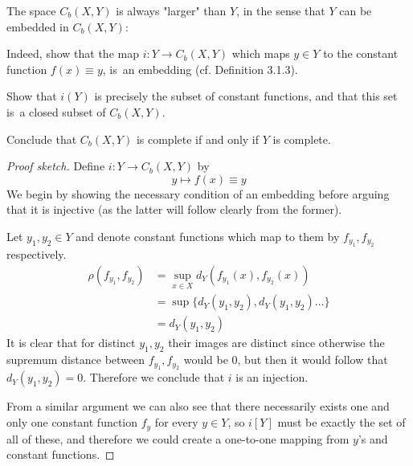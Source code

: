 \begin{prob}
    The space $C_b(X,Y)$ is always "larger" than $Y$, in the sense that $Y$ can be embedded in $C_b(X,Y)$:

    Indeed, show that the map $i:Y\to C_b(X,Y)$ 
    which maps $y\in Y$ to the constant function $f(x)\equiv y$, is an embedding (cf. Definition 3.1.3).
    
    Show that $i(Y)$ is precisely the subset of constant functions, and that this set is a closed subset of $C_b(X,Y)$.
    
    Conclude that $C_b(X,Y)$ is complete if and only if $Y$ is complete.
\end{prob}
\begin{proof}[Proof sketch]
    Define $i: Y \to C_b(X,Y)$ by 
    \[
        y \mapsto f(x) \equiv y
    \]
    We begin by showing the necessary condition of an embedding 
    before arguing that it is injective (as the latter will 
    follow clearly from the former). 

    Let $y_1,y_2 \in Y$ and denote constant functions which map 
    to them by $f_{y_1}, f_{y_2}$ respectively. 
    \begin{align*}
        \rho(f_{y_1}, f_{y_2}) &= \sup_{x\in X}d_Y(f_{y_1}(x), 
        f_{y_2}(x)) \\ 
        &= \sup\{d_Y(y_1, y_2), d_Y(y_1,y_2) \ldots\} \\ 
        &= d_Y(y_1, y_2)
    \end{align*}
    It is clear that for distinct $y_1, y_2$ their images 
    are distinct since otherwise the supremum distance between 
    $f_{y_1}, f_{y_2}$ would be $0$, but then it would follow 
    that $d_Y(y_1, y_2) = 0$. Therefore we conclude that $i$ is 
    an injection.

    From a similar argument we can also see that there necessarily 
    exists one and only one constant function $f_y$ for every 
    $y \in Y$, so $i[Y]$ must be exactly the set of all of these, 
    and therefore we could create a one-to-one mapping 
    from $y$'s and constant functions.  
\end{proof}

